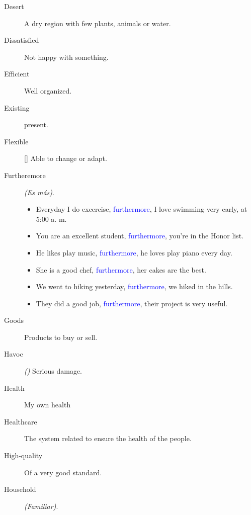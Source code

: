 \begin{multicols}{2}
\begin{description}
\item[Desert] A dry region with few plants, animals or water.

\item[Dissatisfied] Not happy with something.

\item[Efficient] Well organized.

\item[Existing] present.

\item[Flexible] [\emph{}] Able to change or adapt.

\item[Furtheremore] \emph{(Es más)}.
\begin{itemize}
\item Everyday I do excercise, \textcolor{blue}{furthermore}, I love swimming very early, at 5:00 a. m.
\item You are an excellent student, \textcolor{blue}{furthermore}, you're in the Honor list.
\item He likes play music, \textcolor{blue}{furthermore}, he loves play piano every day.
\item She is a good chef, \textcolor{blue}{furthermore}, her cakes are the best.
\item We went to hiking yesterday, \textcolor{blue}{furthermore}, we hiked in the hills.
\item They did a good job, \textcolor{blue}{furthermore}, their project is very useful.
\end{itemize}

\item[Goods] Products to buy or sell.

\item[Havoc] \emph{()} Serious damage.

\item[Health] My own health

\item[Healthcare] The system related to ensure the health of the people.

\item[High-quality] Of a very good standard.

\item[Household] \emph{(Familiar)}.


\end{description}
\end{multicols}

